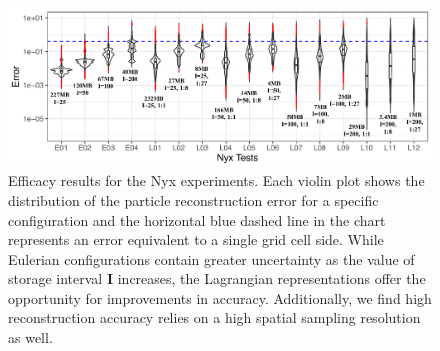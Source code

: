 \begin{figure}[!t]
\centering
\includegraphics[width=\linewidth]{Images/nyx_violinplot.pdf}
\vspace{-5mm}
\caption{Efficacy results for the Nyx experiments. Each violin plot shows the distribution of the particle reconstruction error for a specific configuration and the horizontal blue dashed line in the chart represents an error equivalent to a single grid cell side. While Eulerian configurations contain greater uncertainty as the value of storage interval \textbf{I} increases, the Lagrangian representations offer the opportunity for improvements in accuracy. Additionally, we find high reconstruction accuracy relies on a high spatial sampling resolution as well.}
\label{fig:nyx_violinplot}
\end{figure}
